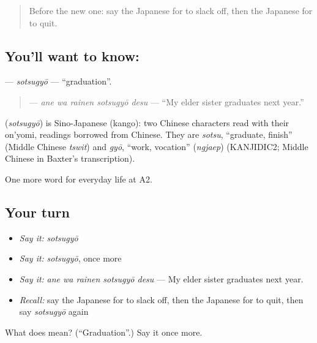 \label{lesson:JA-C228-sotsugyou}



\begin{quote}
Before the new one: say the Japanese for to slack off, then the Japanese for to quit.
\end{quote}

\subsection*{You'll want to know: }
\textbf{} — \emph{sotsugyō} — \textquotedblleft{}graduation\textquotedblright{}.

\begin{quote}
\textbf{  } — \emph{ane wa rainen sotsugyō desu} — \textquotedblleft{}My elder sister graduates next year.\textquotedblright{}
\end{quote}

\begin{cousinweb}
\textbf{} (\emph{sotsugyō}) is Sino-Japanese (kango): two Chinese characters read with their on'yomi, readings borrowed from Chinese. They are \emph{sotsu}, \textquotedblleft{}graduate, finish\textquotedblright{} (Middle Chinese \emph{tswit}) and \emph{gyō}, \textquotedblleft{}work, vocation\textquotedblright{} (\emph{ngjaep}) (KANJIDIC2; Middle Chinese in Baxter's transcription).
\end{cousinweb}

\begin{grammarlens}[title={What you've built}]
One more word for everyday life at A2.
\end{grammarlens}

\subsection*{Your turn}
\begin{itemize}
\raggedright
  \item \emph{Say it:} \emph{sotsugyō}
  \item \emph{Say it:} \emph{sotsugyō}, once more
  \item \emph{Say it:} \emph{ane wa rainen sotsugyō desu} — My elder sister graduates next year.
  \item \emph{Recall:} say the Japanese for to slack off, then the Japanese for to quit, then say \emph{sotsugyō} again
\end{itemize}

\begin{tcolorbox}[breakable,colback=teal!4,colframe=teal!35!black,title={Before you move on}]
What does  mean? (\textquotedblleft{}Graduation\textquotedblright{}.) Say it once more.
\end{tcolorbox}
